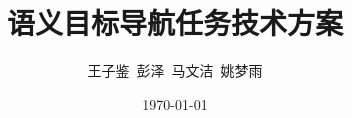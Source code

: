 \documentclass[xcolor=dvipsnames]{beamer}
\title{语义目标导航任务技术方案}
\author{王子鉴~彭泽~马文洁~姚梦雨}
\date{\today}
\begin{document}
\begin{frame}
  \maketitle
\end{frame}









\begin{frame}
  \printbibliography
\end{frame}
\end{document}
